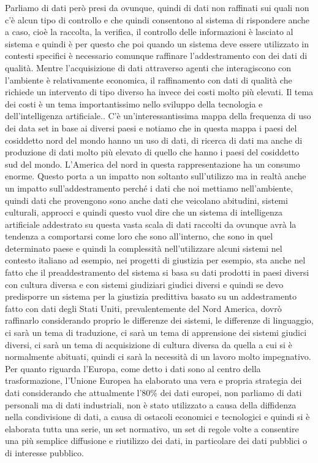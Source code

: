 Parliamo di dati però presi da ovunque, quindi di dati non raffinati sui quali non c'è alcun tipo di controllo e che quindi consentono al sistema di rispondere anche a caso, cioè la raccolta, la verifica, il controllo delle informazioni è lasciato al sistema e quindi è per questo che poi quando un sistema deve essere utilizzato in contesti specifici è necessario comunque raffinare l'addestramento con dei dati di qualità.
Mentre l'acquisizione di dati attraverso agenti che interagiscono con l'ambiente è relativamente economica, il raffinamento con dati di qualità che richiede un intervento di tipo diverso ha invece dei costi molto più elevati.
Il tema dei costi è un tema importantissimo nello sviluppo della tecnologia e dell'intelligenza artificiale..
C'è un'interessantissima mappa della frequenza di uso dei data set in base ai diversi paesi e notiamo che in questa mappa i paesi del cosiddetto nord del mondo hanno un uso di dati, di ricerca di dati ma anche di produzione di dati molto più elevato di quello che hanno i paesi del cosiddetto sud del mondo.
L'America del nord in questa rappresentazione ha un consumo enorme.
Questo porta a un impatto non soltanto sull'utilizzo ma in realtà anche un impatto sull'addestramento perché i dati che noi mettiamo nell'ambiente, quindi dati che provengono sono anche dati che veicolano abitudini, sistemi culturali, approcci e quindi questo vuol dire che un sistema di intelligenza artificiale addestrato su questa vasta scala di dati raccolti da ovunque avrà la tendenza a comportarsi come loro che sono all'interno, che sono in quel determinato paese e quindi la complessità nell'utilizzare alcuni sistemi nel contesto italiano ad esempio, nei progetti di giustizia per esempio, sta anche nel fatto che il preaddestramento del sistema si basa su dati prodotti in paesi diversi con cultura diversa e con sistemi giudiziari giudici diversi e quindi se devo predisporre un sistema per la giustizia predittiva basato su un addestramento fatto con dati degli Stati Uniti, prevalentemente del Nord America, dovrò raffinarlo considerando proprio le differenze dei sistemi, le differenze di linguaggio, ci sarà un tema di traduzione, ci sarà un tema di apprensione dei sistemi giudici diversi, ci sarà un tema di acquisizione di cultura diversa da quella a cui si è normalmente abituati, quindi ci sarà la necessità di un lavoro molto impegnativo.
Per quanto riguarda l'Europa, come detto i dati sono al centro della trasformazione, l'Unione Europea ha elaborato una vera e propria strategia dei dati considerando che attualmente l'80\% dei dati europei, non parliamo di dati personali ma di dati industriali, non è stato utilizzato a causa della diffidenza nella condivisione di dati, a causa di ostacoli economici e tecnologici e quindi si è elaborata tutta una serie, un set normativo, un set di regole volte a consentire una più semplice diffusione e riutilizzo dei dati, in particolare dei dati pubblici o di interesse pubblico.

